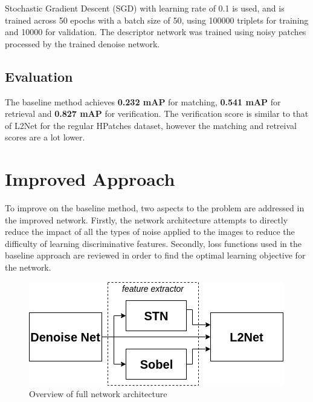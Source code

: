 \documentclass[10pt,twocolumn,letterpaper]{article}
\begin{document}
Stochastic Gradient Descent (SGD) with learning rate of 0.1 is used, and is trained across 50 epochs with a batch size of 50, using 100000 triplets for training and 10000 for validation. The descriptor network was trained using noisy patches processed by the trained denoise network.





\subsection{Evaluation}

The baseline method achieves \textbf{0.232 mAP} for matching, \textbf{0.541 mAP} for retrieval and \textbf{0.827 mAP} for verification.
The verification score is similar to that of L2Net for the regular HPatches dataset, however the matching and retreival scores are a lot lower. 


\section{Improved Approach}

To improve on the baseline method, two aspects to the problem are addressed in the improved network. Firstly, the network architecture attempts to directly reduce the impact of all the types of noise applied to the images to reduce the difficulty of learning discriminative features. Secondly, loss functions used in the baseline approach are reviewed in order to find the optimal learning objective for the network. 

\begin{figure}[H]
\centering
  \includegraphics[width=0.77\linewidth]{report/figures/net_overview.png}
  \caption{Overview of full network architecture}
  \label{fig:full_net}
\end{figure}
\end{document}
